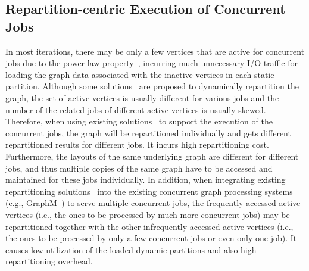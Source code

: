\documentclass[10pt,journal,compsoc]{IEEEtran}
\begin{document}
\subsection{Repartition-centric Execution of Concurrent Jobs}\label{section:Repartitioning}
\vspace{-2pt}
In most iterations, there may be only a few vertices that are active for concurrent jobs due to the power-law property~\cite{PowerGraph}, incurring much unnecessary I/O traffic for loading the graph data associated with the inactive vertices in each static partition.
Although some solutions~\cite{Vora, ReGraph} are proposed to dynamically repartition the graph, the set of active vertices is usually different for various jobs and the number of the related jobs of different active vertices is usually skewed.
Therefore, when using existing solutions~\cite{Vora, ReGraph} to support the execution of the concurrent jobs, the graph will be repartitioned individually and gets different repartitioned results for different jobs. It incurs high repartitioning cost. Furthermore, the layouts of the same underlying graph are different for different jobs, and thus multiple copies of the same graph have to be accessed and maintained for these jobs individually. In addition, when integrating existing repartitioning solutions~\cite{Vora, ReGraph} into the existing concurrent graph processing systems (e.g., GraphM~\cite{GraphM}) to serve multiple concurrent jobs, the frequently accessed active vertices (i.e., the ones to be processed by much more concurrent jobs) may be repartitioned together with the other infrequently accessed active vertices (i.e., the ones to be processed by only a few concurrent jobs or even only one job). 
It causes low utilization of the loaded dynamic partitions and also high repartitioning overhead.
\end{document}

